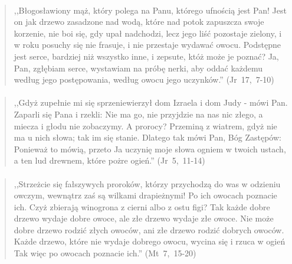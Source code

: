 \documentclass[10pt,a4paper,oneside]{article}
\begin{document}
\paragraph{}
\begin{quote}
,,Błogosławiony mąż, który polega na Panu, którego ufnością jest Pan! Jest on jak drzewo zasadzone nad wodą, które nad potok zapuszcza swoje korzenie, nie boi się, gdy upał nadchodzi, lecz jego liść pozostaje zielony, i w roku posuchy się nie frasuje, i nie przestaje wydawać owocu. Podstępne jest serce, bardziej niż wszystko inne, i zepsute, któż może je poznać? Ja, Pan, zgłębiam serce, wystawiam na próbę nerki, aby oddać każdemu według jego postępowania, według owocu jego uczynków.'' \mbox{(Jr 17, 7-10)}
\end{quote}
\paragraph{}
\begin{quote}
,,Gdyż zupełnie mi się sprzeniewierzył dom Izraela i dom Judy - mówi Pan. Zaparli się Pana i rzekli: Nie ma go, nie przyjdzie na nas nic złego, a miecza i głodu nie zobaczymy. A prorocy? Przeminą z wiatrem, gdyż nie ma u nich słowa; tak im się stanie. Dlatego tak mówi Pan, Bóg Zastępów: Ponieważ to mówią, przeto Ja uczynię moje słowa ogniem w twoich ustach, a ten lud drewnem, które pożre ogień.'' \mbox{(Jr 5, 11-14)}
\end{quote}
\paragraph{}
\begin{quote}
,,Strzeżcie się fałszywych proroków, którzy przychodzą do was w odzieniu owczym, wewnątrz zaś są wilkami drapieżnymi! Po ich owocach poznacie ich. Czyż zbierają winogrona z cierni albo z ostu figi? Tak każde dobre drzewo wydaje dobre owoce, ale złe drzewo wydaje złe owoce. Nie może dobre drzewo rodzić złych owoców, ani złe drzewo rodzić dobrych owoców. Każde drzewo, które nie wydaje dobrego owocu, wycina się i rzuca w ogień Tak więc po owocach poznacie ich.'' \mbox{(Mt 7, 15-20)}
\end{quote}
\end{document}
